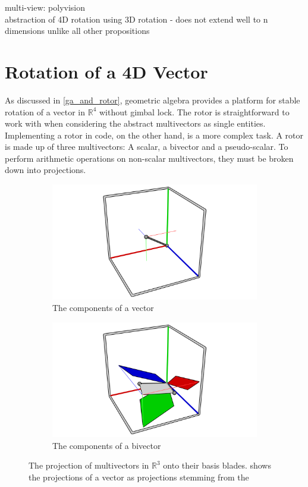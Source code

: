 \documentclass{l4proj}
\begin{document}
multi-view: polyvision\\
abstraction of 4D rotation using 3D rotation - does not extend well to n dimensions unlike all other propositions

\section{Rotation of a 4D Vector}

As discussed in \cref{ga_and_rotor}, geometric algebra provides a platform for stable rotation of a vector in $\mathbb{R}^4$ without gimbal lock. 
The rotor is straightforward to work with when considering the abstract multivectors as single entities. Implementing a rotor in code, on the other hand, is a more complex task. 
A rotor is made up of three multivectors: A scalar, a bivector and a pseudo-scalar. To perform arithmetic operations on non-scalar multivectors, they must be broken down into projections. 

\begin{figure}
  \begin{subfigure}[b]{0.45\textwidth}
    \includegraphics[width=\textwidth]{images/rotation/projection_vec.png}
    \caption{The components of a vector}
    \label{fig:vec_proj}
  \end{subfigure}
  \begin{subfigure}[b]{0.45\textwidth}
    \includegraphics[width=\textwidth]{images/rotation/projection_biv.png}
    \caption{The components of a bivector}
    \label{fig:bivec_proj}
  \end{subfigure}
  \caption{The projection of multivectors in $\mathbb{R}^3$ onto their basis blades.  shows the projections of a vector as projections stemming from the }
  \label{fig:projections}
\end{figure}
\end{document}
